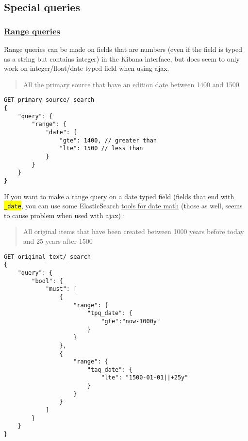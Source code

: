 \documentclass[a4paper,12pt]{article}
\let\OldTexttt\texttt
\renewcommand{\texttt}[1]{\OldTexttt{\hl{#1}}}
\begin{document}
\subsection{Special queries}\label{special-queries}

\subsubsection{\href{https://www.elastic.co/guide/en/elasticsearch/reference/current/query-dsl-range-query.html}{Range queries}}\label{range-queries}

Range queries can be made on fields that are numbers (even if the field is typed as a string but contains integer) in the Kibana interface, but does seem to only work on integer/float/date typed field when using ajax.

\begin{quote}
All the primary source that have an edition date between 1400 and 1500
\end{quote}

\begin{lstlisting}
GET primary_source/_search
{
    "query": {
        "range": {
            "date": {
                "gte": 1400, // greater than
                "lte": 1500 // less than
            }
        }
    }
}
\end{lstlisting}

If you want to make a range query on a date typed field (fields that end with \texttt{\_date}, you can use some ElasticSearch \href{https://www.elastic.co/guide/en/elasticsearch/reference/current/common-options.html\#date-math}{tools for date math} (those as well, seems to cause problem when used with ajax) :

\begin{quote}
All original items that have been created between 1000 years before today and 25 years after 1500
\end{quote}

\begin{lstlisting}
GET original_text/_search
{
    "query": {
        "bool": {
            "must": [
                {
                    "range": {
                        "tpq_date": {
                            "gte":"now-1000y"
                        }
                    }
                },
                {
                    "range": {
                        "taq_date": {
                            "lte": "1500-01-01||+25y"
                        }
                    }
                }
            ]
        }
    }
}
\end{lstlisting}
\end{document}
